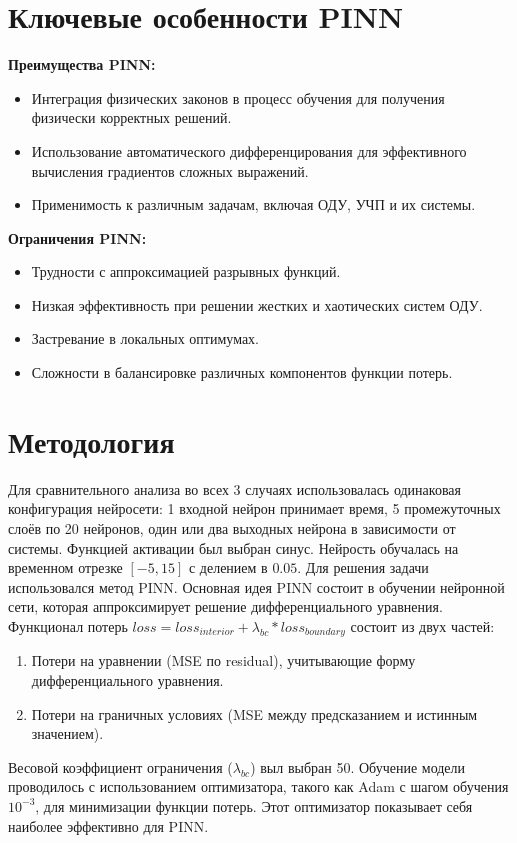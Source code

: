 \documentclass[12pt,a4paper]{article}
\begin{document}
\section{Ключевые особенности PINN}

\begin{minipage}[t]{0.45\textwidth}
    \small
    \textbf{Преимущества PINN:}
    \begin{itemize}
        \item Интеграция физических законов в процесс обучения для получения физически корректных решений.
        \item Использование автоматического дифференцирования для эффективного вычисления градиентов сложных выражений.
        \item Применимость к различным задачам, включая ОДУ, УЧП и их системы.
    \end{itemize}
\end{minipage}
\hfill
\vrule width 0.5pt
\hfill
\begin{minipage}[t]{0.45\textwidth}
    \small
    \textbf{Ограничения PINN:}
    \begin{itemize}
        \item Трудности с аппроксимацией разрывных функций.
        \item Низкая эффективность при решении жестких и хаотических систем ОДУ.
        \item Застревание в локальных оптимумах.
        \item Сложности в балансировке различных компонентов функции потерь.
    \end{itemize}
\end{minipage}

\section{Методология}

Для сравнительного анализа во всех 3 случаях использовалась одинаковая конфигурация нейросети: 1 входной нейрон принимает время, 5 промежуточных слоёв по 20 нейронов, один или два выходных нейрона в зависимости от системы. 
Функцией активации был выбран синус.
Нейрость обучалась на временном отрезке $[-5, 15]$ с делением в $0.05$.
Для решения задачи использовался метод PINN. Основная идея PINN состоит в обучении нейронной сети, которая аппроксимирует решение дифференциального уравнения.
Функционал потерь $loss = loss_{interior} + \lambda_{bc} * loss_{boundary}$ состоит из двух частей:
\begin{enumerate}
    \item Потери на уравнении (MSE по residual), учитывающие форму дифференциального уравнения.
    \item Потери на граничных условиях (MSE между предсказанием и истинным значением).
\end{enumerate}
Весовой коэффициент ограничения ($\lambda_{bc}$) выл выбран 50.
Обучение модели проводилось с использованием оптимизатора, такого как Adam с шагом обучения $10^{-3}$, для минимизации функции потерь. Этот оптимизатор показывает себя наиболее эффективно для PINN.
\end{document}
